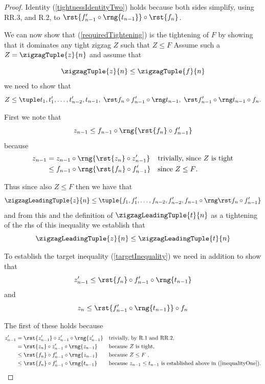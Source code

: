 {\begin{proof}
Identity (\ref{tightnessIdentityTwo}) holds because both sides  simplify, using RR.3, and R.2, to $\rst{f'_{n-1} \circ \rng{t_{n-1}}} \circ \rst{f_n}$.

We can now show that (\ref{requiredTightening})
is the tightening of $F$ by showing that 
it dominates any tight zigzag $Z$ such that
$Z \leq F$ 
Assume such a $Z=\zigzagTuple{z}{n}$ and assume that

\[
\zigzagTuple{z}{n} \leq \zigzagTuple{f}{n}
\]
we need to show that 
\begin{equation}
\label{targetInequality}
Z \leq \leftToRightTightening.
\end{equation} 

First we note that  
\[
 z_{n-1} \leq f_{n-1} \circ 
       \rng{
                \rst{f_n} \circ f'_{n-1}
                     }
\]
because 
\begin{align*}
z_{n-1} &= z_{n-1} \circ \rng{\rst{z_n} \circ z'_{n-1}} && \mbox{trivially, since $Z$ is tight}\\
&\leq  f_{n-1} \circ 
       \rng{
                \rst{f_n} \circ f'_{n-1}
                     } &&\mbox{\parbox{3cm}{since $Z \leq F$.}}
\end{align*}

Thus since also $Z \leq F$ then we have that
\[
\zigzagLeadingTuple{z}{n} \leq \tuple{\tightlead}
\] 
and from this and the definition of $\zigzagLeadingTuple{t}{n}$
as a tightening of the rhs of this inequality we establish that
\[
\label{inequalityOne}
\zigzagLeadingTuple{z}{n} \leq \zigzagLeadingTuple{t}{n}
\]
 
To establish the target inequality (\ref{targetInequality})
we need 
in addition to show that
 \begin{equation}
 \label{inequalityTwo}
 z'_{n-1} \leq \rst{f_n} \circ f'_{n-1} \circ \rng{t_{n-1}}
 \end{equation}
 and
  \begin{equation}
 \label{inequalityThree}
 z_n \leq \rst{f'_{n-1} \circ \rng{t_{n-1}}} \circ f_n
 \end{equation}

The first of these holds because
\begin{align*}
z'_{n-1} &= \rst{z'_{n-1}} \circ z'_{n-1}  \circ \rng{z'_{n-1}} 
                && \mbox{trivially, by R.1 and RR.2,}\\
         &= \rst{z_n} \circ z'_{n-1}  \circ \rng{z_{n-1}} 
         &&\mbox{because $Z$ is tight,}\\
         &\leq \rst{f_n} \circ f'_{n-1}  \circ \rng{z_{n-1}}
         &&\mbox{because $Z \leq F$ ,}\\
         &\leq \rst{f_n} \circ f'_{n-1}  \circ \rng{t_{n-1}}
         &&\mbox{because $z_{n-1} \leq t_{n-1}$ is established
                               above in (\ref{inequalityOne}).}
\end{align*}


\end{proof}}
